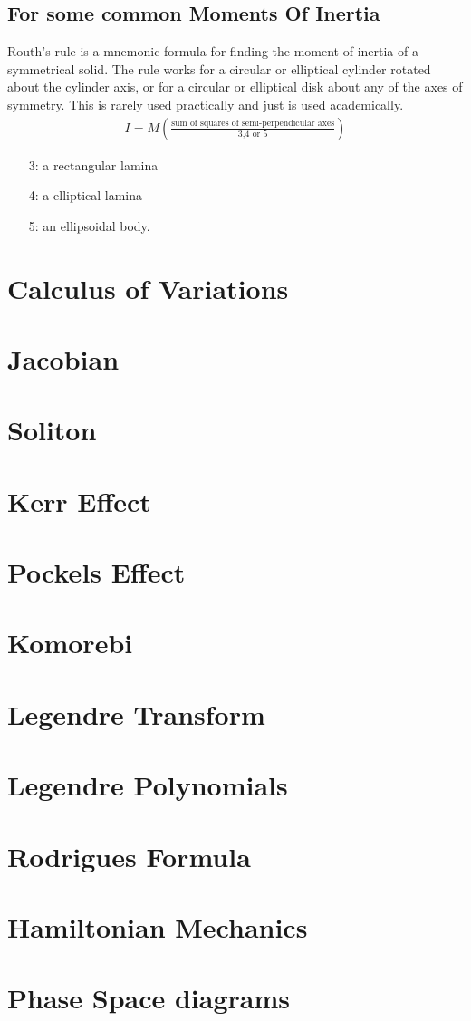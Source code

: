 \documentclass{article}
\begin{document}
\subsection{For some common Moments Of Inertia}
\begin{example*}
Routh's rule is a mnemonic formula for finding the moment of inertia of a symmetrical solid. The rule works for a circular or elliptical cylinder rotated about the cylinder axis, or for a circular or elliptical disk about any of the axes of symmetry. This is rarely used practically and just is used academically.
 \begin{align*}
     I = M\left(\frac{\text{sum of squares of semi-perpendicular axes}}{\text{3,4 or 5}}\right)
 \end{align*}
 \begin{enumerate}
     \item[3:] a rectangular lamina
     \item[4:] a elliptical lamina
     \item[5:] an ellipsoidal body. 
 \end{enumerate}
\end{example*}
\section{Calculus of Variations}
\section{Jacobian}
\section{Soliton}
\section{Kerr Effect}
\section{Pockels Effect}
\section{Komorebi}
\section{Legendre Transform}
\section{Legendre Polynomials}
\section{Rodrigues Formula}
\section{Hamiltonian Mechanics}
\section{Phase Space diagrams}
\end{document}
